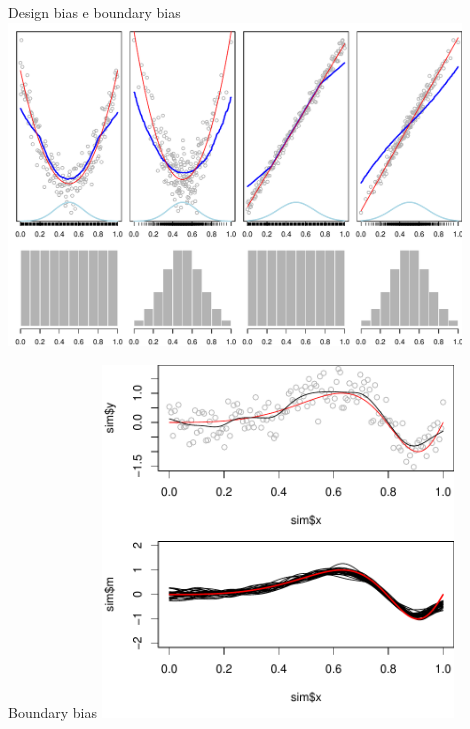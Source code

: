 \documentclass{beamer}\usepackage[]{graphicx}\usepackage[]{color}
\newenvironment{knitrout}{}{} %
\begin{document}
\begin{frame}{Design bias e boundary bias}
\begin{knitrout}
\color{fgcolor}
\includegraphics[width=0.9\textwidth]{figure/020-regression-1unnamed-chunk-14-1} 

\end{knitrout}
\end{frame}



\begin{frame}{Boundary bias}
\begin{knitrout}
\color{fgcolor}
\includegraphics[width=0.7\textwidth]{figure/020-regression-1unnamed-chunk-15-1} 

\end{knitrout}
\end{frame}
\end{document}
